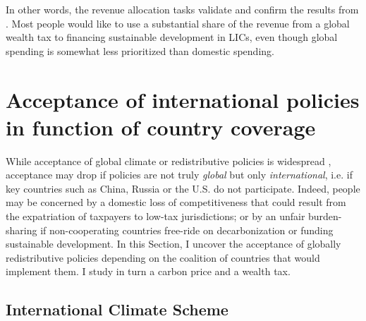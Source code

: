 \documentclass[12pt,english]{article}
\begin{document}
\begin{bibunit}
In other words, the revenue allocation tasks validate and confirm the results from \citep{fabre_majority_2025}. Most people would like to use a substantial share of the revenue from a global wealth tax to financing sustainable development in LICs, even though global spending is somewhat less prioritized than domestic spending. 


\section{Acceptance of international policies in function of country coverage\label{sec:coverage}}

While acceptance of global climate or redistributive policies is widespread \citep{fabre_majority_2025,cappelen_majority_2025}, acceptance may drop if policies are not truly \textit{global} but only \textit{international}, i.e. if key countries such as China, Russia or the U.S. do not participate. Indeed, people may be concerned by a domestic loss of competitiveness that could result from the expatriation of taxpayers to low-tax jurisdictions; or by an unfair burden-sharing if non-cooperating countries free-ride on decarbonization or funding sustainable development. %
In this Section, I uncover the acceptance of globally redistributive policies depending on the coalition of countries that would implement them. I study in turn a carbon price and a wealth tax.

\subsection{International Climate Scheme}\label{subsec:ics}



\end{bibunit}
\end{document}

